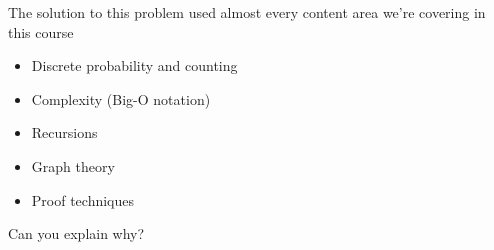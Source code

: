 \documentclass[10pt]{beamer}
\begin{document}
\begin{frame}[label=we-use-course-topics,standout]

\large \centering
The solution to this problem used almost every content area we're covering in this course

\vfill 
\begin{itemize}
	\item Discrete probability and counting
	\item Complexity (Big-O notation)
	\item Recursions
	\item Graph theory
	\item Proof techniques
\end{itemize}
\vfill 
\pause 
\alert{Can you explain why?}
\end{frame}
\end{document}

